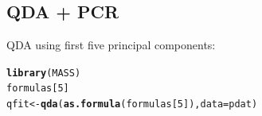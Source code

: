 \documentclass[a4paper]{article}\usepackage[]{graphicx}\usepackage[]{color}
\makeatletter
\newcommand{\hlnum}[1]{\textcolor[rgb]{0.686,0.059,0.569}{#1}}%
\newcommand{\hlstd}[1]{\textcolor[rgb]{0.345,0.345,0.345}{#1}}%
\newcommand{\hlkwb}[1]{\textcolor[rgb]{0.69,0.353,0.396}{#1}}%
\newcommand{\hlkwc}[1]{\textcolor[rgb]{0.333,0.667,0.333}{#1}}%
\newcommand{\hlkwd}[1]{\textcolor[rgb]{0.737,0.353,0.396}{\textbf{#1}}}%
\newenvironment{kframe}{%
 \def\at@end@of@kframe{}%
 \ifinner\ifhmode%
  \def\at@end@of@kframe{\end{minipage}}%
  \begin{minipage}{\columnwidth}%
 \fi\fi%
 \def\FrameCommand##1{\hskip\@totalleftmargin \hskip-\fboxsep
 \colorbox{shadecolor}{##1}\hskip-\fboxsep
     \hskip-\linewidth \hskip-\@totalleftmargin \hskip\columnwidth}%
 \MakeFramed {\advance\hsize-\width
   \@totalleftmargin\z@ \linewidth\hsize
   \@setminipage}}%
 {\par\unskip\endMakeFramed%
 \at@end@of@kframe}
\newenvironment{knitrout}{}{} %
\makeatother
\begin{document}
\subsection{QDA + PCR}

QDA using first five principal components:
\begin{knitrout}
\color{fgcolor}\begin{kframe}
\begin{alltt}
\hlkwd{library}\hlstd{(MASS)}
\hlstd{formulas[}\hlnum{5}\hlstd{]}
\hlstd{qfit} \hlkwb{<-} \hlkwd{qda}\hlstd{(}\hlkwd{as.formula}\hlstd{(formulas[}\hlnum{5}\hlstd{]),} \hlkwc{data}\hlstd{=pdat)}
\end{alltt}
\end{kframe}
\end{knitrout}
\end{document}
